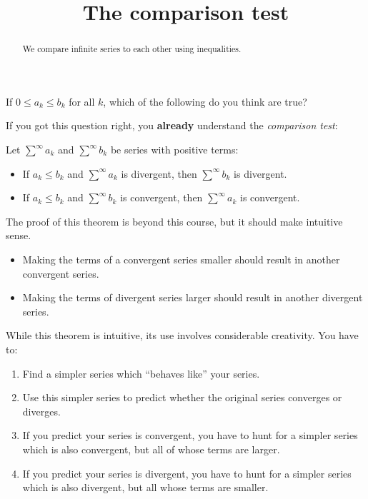 \documentclass{ximera}
\title[Dig-In:]{The comparison test}
\begin{document}
\begin{abstract}
We compare infinite series to each other using inequalities.
\end{abstract}
\maketitle

\begin{question}
  If $0 \leq a_k \leq b_k$ for all $k$, which of the following do you
  think are true?
  \begin{selectAll}
  \end{selectAll}
\end{question}

If you got this question right, you \textbf{already} understand the
\textit{comparison test}:

\begin{theorem}
  Let $\sum^\infty a_k$ and $\sum^\infty b_k$ be series with positive
  terms:
  \begin{itemize}
  \item If $a_k \leq b_k$ and $\sum^\infty a_k$ is divergent, then
    $\sum^\infty b_k$ is divergent.
  \item If $a_k \leq b_k$ and $\sum^\infty b_k$ is convergent, then
    $\sum^\infty a_k$ is convergent.
  \end{itemize}
\end{theorem}

The proof of this theorem is beyond this course, but it should make
intuitive sense.
\begin{itemize}
  \item Making the terms of a convergent series smaller should result
    in another convergent series.
  \item Making the terms of divergent series larger should result in
      another divergent series.
\end{itemize}
While this theorem is intuitive, its use involves considerable
creativity.  You have to:
\begin{enumerate}
\item Find a simpler series which ``behaves like'' your series.
\item Use this simpler series to predict whether the original series
  converges or diverges.
\item If you predict your series is convergent, you have to hunt for a
  simpler series which is also convergent, but all of whose terms are
  larger.
\item If you predict your series is divergent, you have to hunt for a
  simpler series which is also divergent, but all whose terms are
  smaller.
\end{enumerate}
\end{document}
